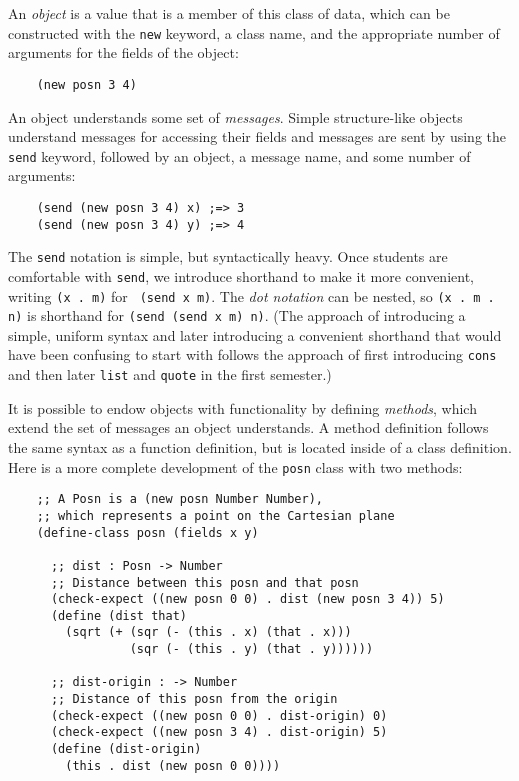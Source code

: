 \documentclass[submission,copyright]{eptcs}
\begin{document}
An \emph{object} is a value that is a member of this class of data,
which can be constructed with the {\tt new} keyword, a class name, and
the appropriate number of arguments for the fields of the object:
\begin{verbatim}
    (new posn 3 4)
\end{verbatim}
An object understands some set of \emph{messages}.  Simple
structure-like objects understand messages for accessing their fields
and messages are sent by using the {\tt send} keyword, followed by an object,
a message name, and some number of arguments:
\begin{verbatim}
    (send (new posn 3 4) x) ;=> 3
    (send (new posn 3 4) y) ;=> 4
\end{verbatim}
The {\tt send} notation is simple, but syntactically heavy.  Once
students are comfortable with {\tt send}, we introduce 
shorthand to make it more convenient, writing {\tt (x . m)} for {\tt
  (send x m)}.  The \emph{dot notation} can be nested, so {\tt (x . m
  . n)} is shorthand for {\tt (send (send x m) n)}.  (The approach of
introducing a simple, uniform syntax and later introducing a
convenient shorthand that would have been confusing to start with
follows the approach of first introducing {\tt cons} and then later {\tt list}
and {\tt quote} in the first semester.)


It is possible to endow objects with functionality by defining \emph{methods},
which extend the set of messages an object understands.  A method definition
follows the same syntax as a function definition, but is located inside of a
class definition.  Here is a more complete development of the {\tt posn} class
with two methods:
\begin{verbatim}
    ;; A Posn is a (new posn Number Number),
    ;; which represents a point on the Cartesian plane
    (define-class posn (fields x y)

      ;; dist : Posn -> Number
      ;; Distance between this posn and that posn
      (check-expect ((new posn 0 0) . dist (new posn 3 4)) 5)
      (define (dist that)
        (sqrt (+ (sqr (- (this . x) (that . x)))
                 (sqr (- (this . y) (that . y))))))

      ;; dist-origin : -> Number
      ;; Distance of this posn from the origin
      (check-expect ((new posn 0 0) . dist-origin) 0)
      (check-expect ((new posn 3 4) . dist-origin) 5)
      (define (dist-origin)
        (this . dist (new posn 0 0))))
\end{verbatim}
\end{document}
